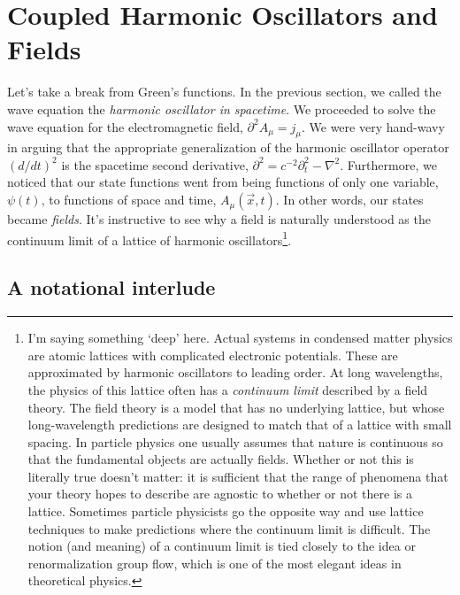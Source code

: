 



\section{Coupled Harmonic Oscillators and Fields}
\label{sec:CHO:fields}

% 

Let's take a break from Green's functions. In the previous section, we called the wave equation the \emph{harmonic oscillator in spacetime}. We proceeded to solve the wave equation for the electromagnetic field, $\partial^2 A_\mu = j_\mu$. We were very hand-wavy in arguing that the appropriate generalization of the harmonic oscillator operator $(d/dt)^2$ is the spacetime second derivative, $\partial^2 = c^{-2}\partial_t^2 - \nabla^2$. Furthermore, we noticed that our state functions went from being functions of only one variable, $\psi(t)$, to functions of space and time, $A_\mu(\vec{x},t)$. In other words, our states became \emph{fields}. It's instructive to see why a field is naturally understood as the continuum limit of a lattice of harmonic oscillators\footnote{I'm saying something `deep' here. Actual systems in condensed matter physics are atomic lattices with complicated electronic potentials. These are approximated by harmonic oscillators to leading order. At long wavelengths, the physics of this lattice often has a \emph{continuum limit} described by a field theory. The field theory is a model that has no underlying lattice, but whose long-wavelength predictions are designed to match that of a lattice with small spacing. In particle physics one usually assumes that nature is continuous so that the fundamental objects are actually fields. Whether or not this is literally true doesn't matter: it is sufficient that the range of phenomena that your theory hopes to describe are agnostic to whether or not there is a lattice. Sometimes particle physicists go the opposite way and use lattice techniques to make predictions where the continuum limit is difficult. The notion (and meaning) of a continuum limit is tied closely to the idea or renormalization group flow, which is one of the most elegant ideas in theoretical physics.}.


\subsection{A notational interlude}

